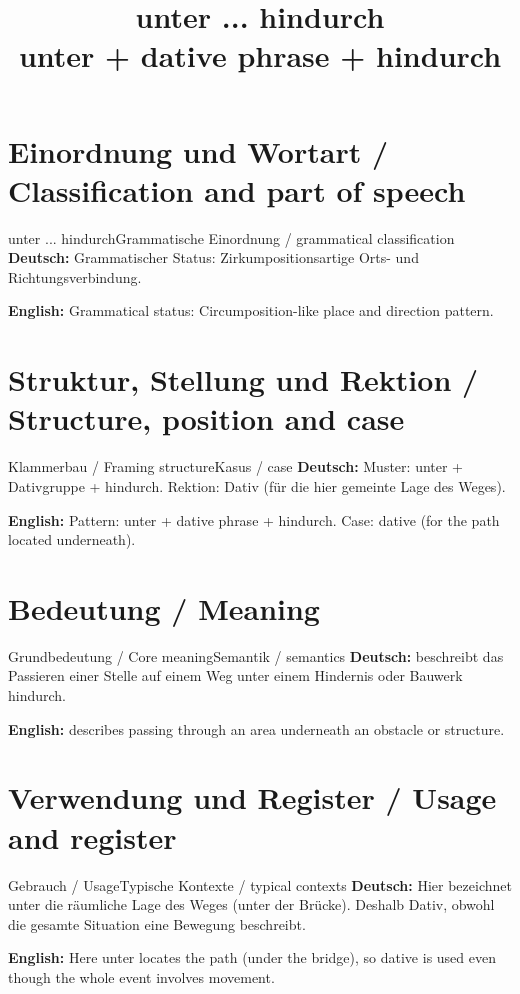 \documentclass[a4paper,11pt]{article}
\title{unter ... hindurch\\ \large unter + dative phrase + hindurch}
\date{}
\newcommand{\GermanText}[1]{\textbf{Deutsch: }#1\par}
\newcommand{\EnglishText}[1]{{\small\color{SoftGray}\textbf{English: }#1\par}}
\begin{document}
\maketitle
\tableofcontents
\newpage
\section{Einordnung und Wortart / Classification and part of speech}
\begin{grammarentry}{unter ... hindurch}{Grammatische Einordnung / grammatical classification}
\GermanText{Grammatischer Status: Zirkumpositionsartige Orts- und Richtungsverbindung.}
\EnglishText{Grammatical status: Circumposition-like place and direction pattern.}
\end{grammarentry}
\section{Struktur, Stellung und Rektion / Structure, position and case}
\begin{grammarentry}{Klammerbau / Framing structure}{Kasus / case}
\GermanText{Muster: unter + Dativgruppe + hindurch. Rektion: Dativ (für die hier gemeinte Lage des Weges).}
\EnglishText{Pattern: unter + dative phrase + hindurch. Case: dative (for the path located underneath).}
\end{grammarentry}
\section{Bedeutung / Meaning}
\begin{grammarentry}{Grundbedeutung / Core meaning}{Semantik / semantics}
\GermanText{beschreibt das Passieren einer Stelle auf einem Weg unter einem Hindernis oder Bauwerk hindurch.}
\EnglishText{describes passing through an area underneath an obstacle or structure.}
\end{grammarentry}
\section{Verwendung und Register / Usage and register}
\begin{grammarentry}{Gebrauch / Usage}{Typische Kontexte / typical contexts}
\GermanText{Hier bezeichnet unter die räumliche Lage des Weges (unter der Brücke). Deshalb Dativ, obwohl die gesamte Situation eine Bewegung beschreibt.}
\EnglishText{Here unter locates the path (under the bridge), so dative is used even though the whole event involves movement.}
\end{grammarentry}
\end{document}
